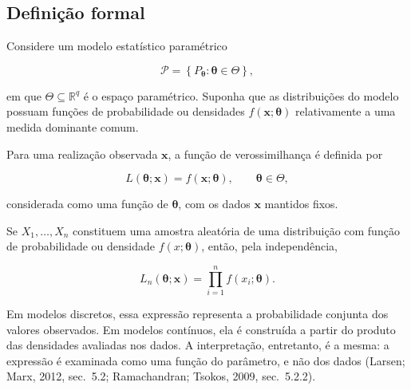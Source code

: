\documentclass[
  letterpaper,
  DIV=11,
  numbers=noendperiod]{scrreprt}
\begin{document}
\subsection{Definição formal}\label{definiuxe7uxe3o-formal}

Considere um modelo estatístico paramétrico

\[\mathcal{P}
=
\left\{
P_{\boldsymbol\theta}:
\boldsymbol\theta\in\Theta
\right\},\]

em que \(\Theta\subseteq\mathbb{R}^q\) é o espaço paramétrico. Suponha
que as distribuições do modelo possuam funções de probabilidade ou
densidades \(f(\mathbf{x};\boldsymbol\theta)\) relativamente a uma
medida dominante comum.

\begin{tcolorbox}[enhanced jigsaw, colback=white, leftrule=.75mm, colbacktitle=quarto-callout-important-color!10!white, breakable, titlerule=0mm, bottomtitle=1mm, title=\textcolor{quarto-callout-important-color}{\faExclamation}\hspace{0.5em}{Definição: função de verossimilhança}, colframe=quarto-callout-important-color-frame, toprule=.15mm, opacityback=0, bottomrule=.15mm, opacitybacktitle=0.6, arc=.35mm, toptitle=1mm, rightrule=.15mm, coltitle=black, left=2mm]

Para uma realização observada \(\mathbf{x}\), a função de
verossimilhança é definida por

\[L(\boldsymbol\theta;\mathbf{x})
=
f(\mathbf{x};\boldsymbol\theta),
\qquad
\boldsymbol\theta\in\Theta,\]

considerada como uma função de \(\boldsymbol\theta\), com os dados
\(\mathbf{x}\) mantidos fixos.

\end{tcolorbox}

Se \(X_1,\ldots,X_n\) constituem uma amostra aleatória de uma
distribuição com função de probabilidade ou densidade
\(f(x;\boldsymbol\theta)\), então, pela independência,

\[L_n(\boldsymbol\theta;\mathbf{x})
=
\prod_{i=1}^n
f(x_i;\boldsymbol\theta).\]

Em modelos discretos, essa expressão representa a probabilidade conjunta
dos valores observados. Em modelos contínuos, ela é construída a partir
do produto das densidades avaliadas nos dados. A interpretação,
entretanto, é a mesma: a expressão é examinada como uma função do
parâmetro, e não dos dados (Larsen; Marx, 2012, sec.~5.2; Ramachandran;
Tsokos, 2009, sec.~5.2.2).
\end{document}
